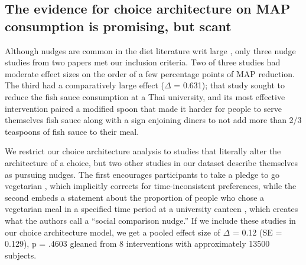\documentclass[sn-nature,referee,pdflatex]{sn-jnl}
\begin{document}
\subsection{The evidence for choice architecture on MAP consumption is
promising, but scant}\label{sec2.5}

Although nudges are common in the diet literature writ large
\citep{olafsson2024, cadario2020, szaszi2018}, only three nudge studies
from two papers \citep{kanchanachitra2020, andersson2021} met our
inclusion criteria. Two of three studies had moderate effect sizes on
the order of a few percentage points of MAP reduction. The third had a
comparatively large effect (\(\Delta\) = 0.631); that study sought to
reduce the fish sauce consumption at a Thai university, and its most
effective intervention paired a modified spoon that made it harder for
people to serve themselves fish sauce along with a sign enjoining diners
to not add more than 2/3 teaspoons of fish sauce to their meal.

We restrict our choice architecture analysis to studies that literally
alter the architecture of a choice, but two other studies in our dataset
describe themselves as pursuing nudges. The first encourages
participants to take a pledge to go vegetarian \citep{banerjee2019},
which implicitly corrects for time-inconsistent preferences, while the
second embeds a statement about the proportion of people who chose a
vegetarian meal in a specified time period at a university canteen
\citep{griesoph2021}, which creates what the authors call a ``social
comparison nudge.'' If we include these studies in our choice
architecture model, we get a pooled effect size of \(\Delta\) = 0.12 (SE
= 0.129), p = .4603 gleaned from 8 interventions with approximately
13500 subjects.
\end{document}
